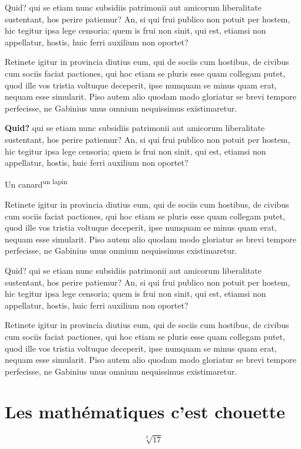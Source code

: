 \documentclass{report}
\begin{document}
Quid? qui se etiam nunc subsidiis patrimonii aut amicorum liberalitate sustentant,
hos perire patiemur? An, si qui frui publico non potuit per hostem, hic tegitur ipsa
lege censoria; quem is frui non sinit, qui est, etiamsi non appellatur, hostis, huic
ferri auxilium non oportet?

Retinete igitur in provincia diutius eum, qui de sociis
cum hostibus, de civibus cum sociis faciat pactiones, qui hoc etiam se pluris esse
quam collegam putet, quod ille vos tristia voltuque deceperit, ipse numquam se minus
quam erat, nequam esse simularit. Piso autem alio quodam modo gloriatur se brevi
tempore perfecisse,
ne Gabinius unus omnium nequissimus existimaretur.


\textbf{Quid?} 
qui se etiam nunc subsidiis patrimonii aut amicorum liberalitate sustentant,
hos perire patiemur? An, si qui frui publico non potuit per hostem, hic tegitur ipsa
lege censoria; quem is frui non sinit, qui est, etiamsi non appellatur, hostis, huic
ferri auxilium non oportet?


{\LARGE Un canard\textsuperscript{un lapin} }


Retinete igitur in provincia diutius eum, qui de sociis
cum hostibus, de civibus cum sociis faciat pactiones, qui hoc etiam se pluris esse
quam collegam putet, quod ille vos tristia voltuque deceperit, ipse numquam se minus
quam erat, nequam esse simularit. Piso autem alio quodam modo gloriatur se brevi
tempore perfecisse,
ne Gabinius unus omnium nequissimus existimaretur.

Quid? qui se etiam nunc subsidiis patrimonii aut amicorum liberalitate sustentant,
hos perire patiemur? An, si qui frui publico non potuit per hostem, hic tegitur ipsa
lege censoria; quem is frui non sinit, qui est, etiamsi non appellatur, hostis, huic
ferri auxilium non oportet?

Retinete igitur in provincia diutius eum, qui de sociis
cum hostibus, de civibus cum sociis faciat pactiones, qui hoc etiam se pluris esse
quam collegam putet, quod ille vos tristia voltuque deceperit, ipse numquam se minus
quam erat, nequam esse simularit. Piso autem alio quodam modo gloriatur se brevi
tempore perfecisse,
ne Gabinius unus omnium nequissimus existimaretur.

\section{Les mathématiques c'est chouette}

\[\sqrt[3]{17}\]
\end{document}

